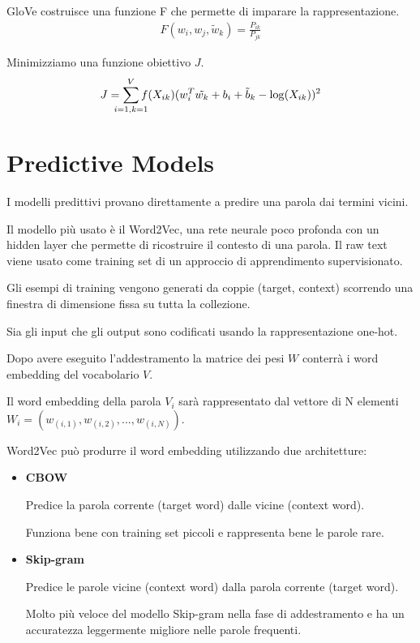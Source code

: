 GloVe costruisce una funzione F che permette di imparare la rappresentazione.
%
\begin{align*}
  F(w_i, w_j, \tilde{w}_k) = \frac{P_{ik}}{P_{jk}}
\end{align*}

Minimizziamo una funzione obiettivo $J$.
\begin{align*}
  J = \sum_{\mathclap{\substack{i = 1, k = 1}}}^V f(X_{ik}) (w_i^T \tilde{w_k} + b_i + \tilde{b}_k - \log(X_{ik}))^2
\end{align*}

\section{Predictive Models}
I modelli predittivi provano direttamente a predire una parola dai termini vicini.

Il modello più usato è il Word2Vec, una rete neurale poco profonda con un hidden layer che permette di ricostruire il contesto di una parola.
Il raw text viene usato come training set di un approccio di apprendimento supervisionato.

Gli esempi di training vengono generati da coppie (target, context) scorrendo una finestra di dimensione fissa su
tutta la collezione.

Sia gli input che gli output sono codificati usando la rappresentazione one-hot.

Dopo avere eseguito l'addestramento la matrice dei pesi $W$ conterrà i word embedding del vocabolario $V$.

Il word embedding della parola $V_i$ sarà rappresentato dal vettore di N elementi $W_i = (w_{(i, 1)}, w_{(i, 2)}, ..., w_{(i, N)})$.

Word2Vec può produrre il word embedding utilizzando due architetture:
\begin{itemize}
  \item  \textbf{CBOW}

        Predice la parola corrente (target word) dalle vicine (context word).

        Funziona bene con training set piccoli e rappresenta bene le parole rare.
  \item \textbf{Skip-gram}

        Predice le parole vicine (context word) dalla parola corrente (target word).

        Molto più veloce del modello Skip-gram nella fase di addestramento e ha un accuratezza leggermente migliore nelle parole frequenti.
\end{itemize}

